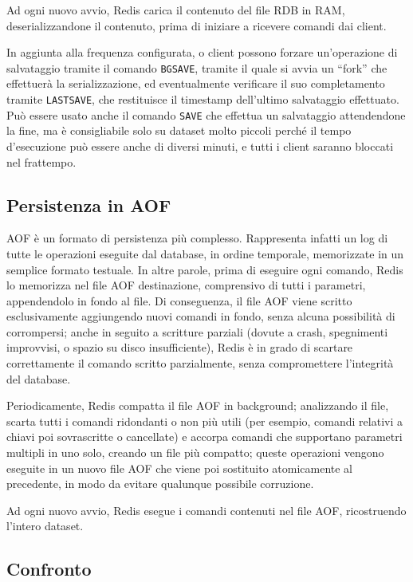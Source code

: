 Ad ogni nuovo avvio, Redis carica il contenuto del file RDB in RAM, deserializzandone il contenuto,
prima di iniziare a ricevere comandi dai client.

In aggiunta alla frequenza configurata, o client possono forzare un'operazione di salvataggio 
tramite il comando \verb|BGSAVE|, tramite il quale si avvia un ``fork'' che effettuerà la
serializzazione, ed eventualmente verificare il suo completamento tramite \verb|LASTSAVE|, che
restituisce il timestamp dell'ultimo salvataggio effettuato. Può essere usato anche il comando
\verb|SAVE| che effettua un salvataggio attendendone la fine, ma è consigliabile solo su dataset
molto piccoli perché il tempo d'esecuzione può essere anche di diversi minuti, e tutti i client
saranno bloccati nel frattempo.


\subsection{Persistenza in AOF}
\label{sec:durability:aof}

AOF è un formato di persistenza più complesso. Rappresenta infatti un log di tutte le operazioni
eseguite dal database, in ordine temporale, memorizzate in un semplice formato testuale. In altre
parole, prima di eseguire ogni comando, Redis lo memorizza nel file AOF destinazione, comprensivo di
tutti i parametri, appendendolo in fondo al file. Di conseguenza, il file AOF viene scritto
esclusivamente aggiungendo nuovi comandi in fondo, senza alcuna possibilità di corrompersi; anche in
seguito a scritture parziali (dovute a crash, spegnimenti improvvisi, o spazio su disco
insufficiente), Redis è in grado di scartare correttamente il comando scritto parzialmente, senza
compromettere l'integrità del database.

Periodicamente, Redis compatta il file AOF in background; analizzando il file, scarta tutti i
comandi ridondanti o non più utili (per esempio, comandi relativi a chiavi poi sovrascritte o
cancellate) e accorpa comandi che supportano parametri multipli in uno solo, creando un file più
compatto; queste operazioni vengono eseguite in un nuovo file AOF che viene poi sostituito
atomicamente al precedente, in modo da evitare qualunque possibile corruzione.

Ad ogni nuovo avvio, Redis esegue i comandi contenuti nel file AOF, ricostruendo l'intero dataset.


\subsection{Confronto}

